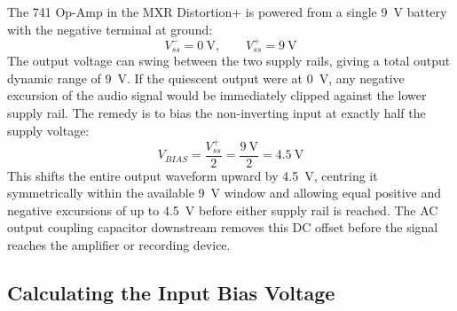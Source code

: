 The 741 Op-Amp in the MXR Distortion+ is powered from a single \SI{9}{\volt} battery with the negative terminal at ground:
\[
V_{ss}^{-} = \SI{0}{\volt}, \qquad V_{ss}^{+} = \SI{9}{\volt}
\]
The output voltage can swing between the two supply rails, giving a total output dynamic range of \SI{9}{\volt}.
If the quiescent output were at \SI{0}{\volt}, any negative excursion of the audio signal would be immediately clipped against the lower supply rail.
The remedy is to bias the non-inverting input at exactly half the supply voltage:
\[
V_{BIAS} = \frac{V_{ss}^{+}}{2} = \frac{\SI{9}{\volt}}{2} = \SI{4.5}{\volt}
\]
This shifts the entire output waveform upward by \SI{4.5}{\volt}, centring it symmetrically within the available \SI{9}{\volt} window and allowing equal positive and negative excursions of up to \SI{4.5}{\volt} before either supply rail is reached.
The AC output coupling capacitor downstream removes this DC offset before the signal reaches the amplifier or recording device.

\subsection{Calculating the Input Bias Voltage}


